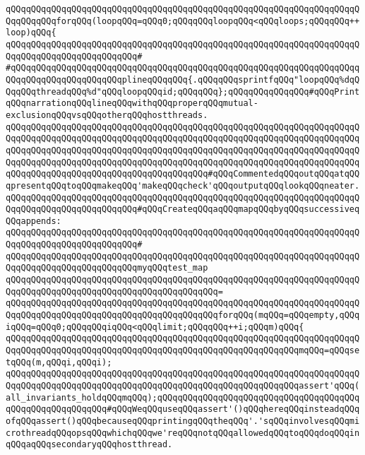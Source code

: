 \newline
\verb|qQQqqQQqqQQqqQQqqQQqqQQqqQQqqQQqqQQqqQQqqQQqqQQqqQQqqQQqqQQqqQQqqQQqqQQqqQQqqQQqforqQQq(loopqQQq=qQQq0;qQQqqQQqloopqQQq<qQQqloops;qQQqqQQq++loop)qQQq{|\newline
\verb|qQQqqQQqqQQqqQQqqQQqqQQqqQQqqQQqqQQqqQQqqQQqqQQqqQQqqQQqqQQqqQQqqQQqqQQqqQQqqQQqqQQqqQQqqQQqqQQq#|\newline
\verb|#qQQqqQQqqQQqqQQqqQQqqQQqqQQqqQQqqQQqqQQqqQQqqQQqqQQqqQQqqQQqqQQqqQQqqQQqqQQqqQQqqQQqqQQqqQQqplineqQQqqQQq{.qQQqqQQqsprintfqQQq"loopqQQq%dqQQqqQQqthreadqQQq%d"qQQqloopqQQqid;qQQqqQQq};qQQqqQQqqQQqqQQq#qQQqPrintqQQqnarrationqQQqlineqQQqwithqQQqproperqQQqmutual-exclusionqQQqvsqQQqotherqQQqhostthreads.|\newline
\verb|qQQqqQQqqQQqqQQqqQQqqQQqqQQqqQQqqQQqqQQqqQQqqQQqqQQqqQQqqQQqqQQqqQQqqQQqqQQqqQQqqQQqqQQqqQQqqQQqqQQqqQQqqQQqqQQqqQQqqQQqqQQqqQQqqQQqqQQqqQQqqQQqqQQqqQQqqQQqqQQqqQQqqQQqqQQqqQQqqQQqqQQqqQQqqQQqqQQqqQQqqQQqqQQqqQQqqQQqqQQqqQQqqQQqqQQqqQQqqQQqqQQqqQQqqQQqqQQqqQQqqQQqqQQqqQQqqQQqqQQqqQQqqQQqqQQqqQQqqQQqqQQqqQQqqQQqqQQqqQQq#qQQqCommentedqQQqoutqQQqatqQQqpresentqQQqtoqQQqmakeqQQq'makeqQQqcheck'qQQqoutputqQQqlookqQQqneater.|\newline
\verb|qQQqqQQqqQQqqQQqqQQqqQQqqQQqqQQqqQQqqQQqqQQqqQQqqQQqqQQqqQQqqQQqqQQqqQQqqQQqqQQqqQQqqQQqqQQqqQQq#qQQqCreateqQQqaqQQqmapqQQqbyqQQqsuccessiveqQQqappends:|\newline
\verb|qQQqqQQqqQQqqQQqqQQqqQQqqQQqqQQqqQQqqQQqqQQqqQQqqQQqqQQqqQQqqQQqqQQqqQQqqQQqqQQqqQQqqQQqqQQqqQQq#|\newline
\verb|qQQqqQQqqQQqqQQqqQQqqQQqqQQqqQQqqQQqqQQqqQQqqQQqqQQqqQQqqQQqqQQqqQQqqQQqqQQqqQQqqQQqqQQqqQQqqQQqmyqQQqtest_map|\newline
\verb|qQQqqQQqqQQqqQQqqQQqqQQqqQQqqQQqqQQqqQQqqQQqqQQqqQQqqQQqqQQqqQQqqQQqqQQqqQQqqQQqqQQqqQQqqQQqqQQqqQQqqQQqqQQqqQQq=|\newline
\verb|qQQqqQQqqQQqqQQqqQQqqQQqqQQqqQQqqQQqqQQqqQQqqQQqqQQqqQQqqQQqqQQqqQQqqQQqqQQqqQQqqQQqqQQqqQQqqQQqqQQqqQQqqQQqqQQqforqQQq(mqQQq=qQQqempty,qQQqiqQQq=qQQq0;qQQqqQQqiqQQq<qQQqlimit;qQQqqQQq++i;qQQqm)qQQq{|\newline
\newline
\verb|qQQqqQQqqQQqqQQqqQQqqQQqqQQqqQQqqQQqqQQqqQQqqQQqqQQqqQQqqQQqqQQqqQQqqQQqqQQqqQQqqQQqqQQqqQQqqQQqqQQqqQQqqQQqqQQqqQQqqQQqqQQqqQQqmqQQq=qQQqsetqQQq(m,qQQqi,qQQqi);|\newline
\newline
\verb|qQQqqQQqqQQqqQQqqQQqqQQqqQQqqQQqqQQqqQQqqQQqqQQqqQQqqQQqqQQqqQQqqQQqqQQqqQQqqQQqqQQqqQQqqQQqqQQqqQQqqQQqqQQqqQQqqQQqqQQqqQQqqQQqassert'qQQq(all_invariants_holdqQQqmqQQq);qQQqqQQqqQQqqQQqqQQqqQQqqQQqqQQqqQQqqQQqqQQqqQQqqQQqqQQqqQQq#qQQqWeqQQquseqQQqassert'()qQQqhereqQQqinsteadqQQqofqQQqassert()qQQqbecauseqQQqprintingqQQqtheqQQq'.'sqQQqinvolvesqQQqmicrothreadqQQqopsqQQqwhichqQQqwe'reqQQqnotqQQqallowedqQQqtoqQQqdoqQQqinqQQqaqQQqsecondaryqQQqhostthread.|\newline
